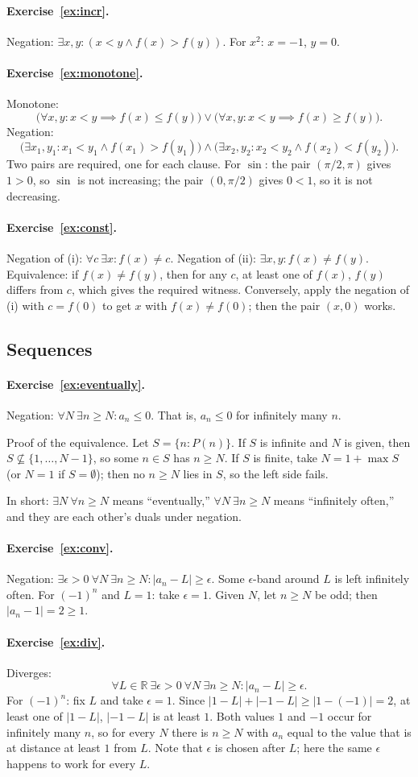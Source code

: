 \documentclass{workbook}
\theoremstyle{definition}
\newcommand{\R}{\mathbb{R}}
\newcommand{\ans}[1]{\paragraph{Exercise~\ref{#1}.}}
\begin{document}
\ans{ex:incr}
Negation: $\exists x, y : (x < y \land f(x) > f(y))$. For $x^2$: $x = -1$, $y = 0$.

\ans{ex:monotone}
Monotone:
\[
  \bigl(\forall x, y : x < y \implies f(x) \le f(y)\bigr) \lor \bigl(\forall x, y : x < y \implies f(x) \ge f(y)\bigr).
\]
Negation:
\[
  \bigl(\exists x_1, y_1 : x_1 < y_1 \land f(x_1) > f(y_1)\bigr) \land \bigl(\exists x_2, y_2 : x_2 < y_2 \land f(x_2) < f(y_2)\bigr).
\]
Two pairs are required, one for each clause. For $\sin$: the pair $(\pi/2, \pi)$ gives $1 > 0$, so $\sin$ is not increasing; the pair $(0, \pi/2)$ gives $0 < 1$, so it is not decreasing.

\ans{ex:const}
Negation of (i): $\forall c\ \exists x : f(x) \ne c$. Negation of (ii): $\exists x, y : f(x) \ne f(y)$. Equivalence: if $f(x) \ne f(y)$, then for any $c$, at least one of $f(x)$, $f(y)$ differs from $c$, which gives the required witness. Conversely, apply the negation of (i) with $c = f(0)$ to get $x$ with $f(x) \ne f(0)$; then the pair $(x, 0)$ works.

\subsection*{Sequences}

\ans{ex:eventually}
Negation: $\forall N\ \exists n \ge N : a_n \le 0$. That is, $a_n \le 0$ for infinitely many $n$.

Proof of the equivalence. Let $S = \{n : P(n)\}$. If $S$ is infinite and $N$ is given, then $S \not\subseteq \{1, \dots, N-1\}$, so some $n \in S$ has $n \ge N$. If $S$ is finite, take $N = 1 + \max S$ (or $N = 1$ if $S = \emptyset$); then no $n \ge N$ lies in $S$, so the left side fails.

In short: $\exists N\ \forall n \ge N$ means ``eventually,'' $\forall N\ \exists n \ge N$ means ``infinitely often,'' and they are each other's duals under negation.

\ans{ex:conv}
Negation: $\exists \epsilon > 0\ \forall N\ \exists n \ge N : |a_n - L| \ge \epsilon$. Some $\epsilon$-band around $L$ is left infinitely often. For $(-1)^n$ and $L = 1$: take $\epsilon = 1$. Given $N$, let $n \ge N$ be odd; then $|a_n - 1| = 2 \ge 1$.

\ans{ex:div}
Diverges:
\[
  \forall L \in \R\ \exists \epsilon > 0\ \forall N\ \exists n \ge N : |a_n - L| \ge \epsilon.
\]
For $(-1)^n$: fix $L$ and take $\epsilon = 1$. Since $|1 - L| + |{-1} - L| \ge |1 - (-1)| = 2$, at least one of $|1 - L|$, $|{-1} - L|$ is at least $1$. Both values $1$ and $-1$ occur for infinitely many $n$, so for every $N$ there is $n \ge N$ with $a_n$ equal to the value that is at distance at least $1$ from $L$. Note that $\epsilon$ is chosen after $L$; here the same $\epsilon$ happens to work for every $L$.
\end{document}
